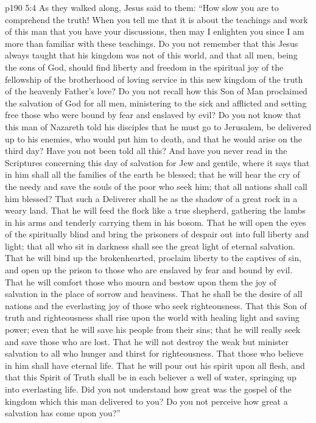 \vs p190 5:4 As they walked along, Jesus said to them: \textcolor{ubdarkred}{“How slow you are to comprehend the truth! When you tell me that it is about the teachings and work of this man that you have your discussions, then may I enlighten you since I am more than familiar with these teachings. Do you not remember that this Jesus always taught that his kingdom was not of this world, and that all men, being the sons of God, should find liberty and freedom in the spiritual joy of the fellowship of the brotherhood of loving service in this new kingdom of the truth of the heavenly Father’s love? Do you not recall how this Son of Man proclaimed the salvation of God for all men, ministering to the sick and afflicted and setting free those who were bound by fear and enslaved by evil? Do you not know that this man of Nazareth told his disciples that he must go to Jerusalem, be delivered up to his enemies, who would put him to death, and that he would arise on the third day? Have you not been told all this? And have you never read in the Scriptures concerning this day of salvation for Jew and gentile, where it says that in him shall all the families of the earth be blessed; that he will hear the cry of the needy and save the souls of the poor who seek him; that all nations shall call him blessed? That such a Deliverer shall be as the shadow of a great rock in a weary land. That he will feed the flock like a true shepherd, gathering the lambs in his arms and tenderly carrying them in his bosom. That he will open the eyes of the spiritually blind and bring the prisoners of despair out into full liberty and light; that all who sit in darkness shall see the great light of eternal salvation. That he will bind up the brokenhearted, proclaim liberty to the captives of sin, and open up the prison to those who are enslaved by fear and bound by evil. That he will comfort those who mourn and bestow upon them the joy of salvation in the place of sorrow and heaviness. That he shall be the desire of all nations and the everlasting joy of those who seek righteousness. That this Son of truth and righteousness shall rise upon the world with healing light and saving power; even that he will save his people from their sins; that he will really seek and save those who are lost. That he will not destroy the weak but minister salvation to all who hunger and thirst for righteousness. That those who believe in him shall have eternal life. That he will pour out his spirit upon all flesh, and that this Spirit of Truth shall be in each believer a well of water, springing up into everlasting life. Did you not understand how great was the gospel of the kingdom which this man delivered to you? Do you not perceive how great a salvation has come upon you?”}
